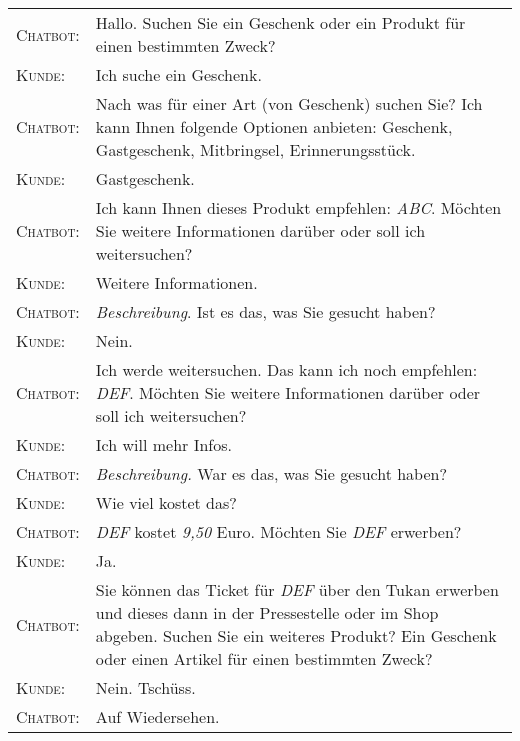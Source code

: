 \begin{center}
\begin{tabular}{p{}p{}}
	\textsc{Chatbot:} & Hallo. Suchen Sie ein Geschenk oder ein Produkt für einen bestimmten Zweck? \\
	\textsc{Kunde:} & Ich suche ein Geschenk.\\
	\textsc{Chatbot:} & Nach was für einer Art (von Geschenk) suchen Sie? Ich kann Ihnen folgende Optionen anbieten: Geschenk, Gastgeschenk, Mitbringsel, Erinnerungsstück.\\
	\textsc{Kunde:} & Gastgeschenk. \\
	\textsc{Chatbot:} & Ich kann Ihnen dieses Produkt empfehlen: \textit{ABC}. Möchten Sie weitere Informationen darüber oder soll ich weitersuchen?\\
	\textsc{Kunde:} & Weitere Informationen. \\
	\textsc{Chatbot:} & \textit{Beschreibung}. Ist es das, was Sie gesucht haben?\\
	\textsc{Kunde:} & Nein. \\
	\textsc{Chatbot:} & Ich werde weitersuchen. Das kann ich noch empfehlen: \textit{DEF}. Möchten Sie weitere Informationen darüber oder soll ich weitersuchen? \\
	\textsc{Kunde:} & Ich will mehr Infos. \\
	\textsc{Chatbot:} & \textit{Beschreibung.} War es das, was Sie gesucht haben? \\
	\textsc{Kunde:} & Wie viel kostet das? \\
	\textsc{Chatbot:} & \textit{DEF} kostet \textit{9,50} Euro. Möchten Sie \textit{DEF} erwerben?\\
	\textsc{Kunde:} &  Ja.\\
	\textsc{Chatbot:} & Sie können das Ticket für \textit{DEF} über den Tukan erwerben und dieses dann in der Pressestelle oder im Shop abgeben. Suchen Sie ein weiteres Produkt? Ein Geschenk oder einen Artikel für einen bestimmten Zweck?\\
	\textsc{Kunde:} & Nein. Tschüss. \\
	\textsc{Chatbot:} & Auf Wiedersehen.\\
	\end{tabular}
\end{center}
\vspace{12pt}


